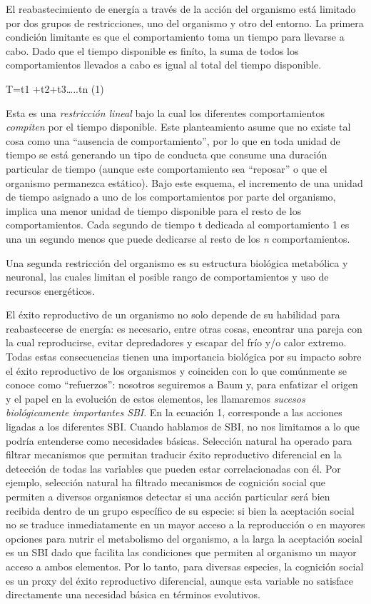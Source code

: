 \documentclass[
  a4paper,
  DIV=11,
  numbers=noendperiod]{scrreprt}
\begin{document}
El reabastecimiento de energía a través de la acción del organismo está
limitado por dos grupos de restricciones, uno del organismo y otro del
entorno. La primera condición limitante es que el comportamiento toma un
tiempo para llevarse a cabo. Dado que el tiempo disponible es ﬁníto, la
suma de todos los comportamientos llevados a cabo es igual al total del
tiempo disponible.

T=t1 +t2+t3\ldots..tn (1)

Esta es una \emph{restricción lineal} bajo la cual los diferentes
comportamientos \emph{compiten} por el tiempo disponible. Este
planteamiento asume que no existe tal cosa como una ``ausencia de
comportamiento'', por lo que en toda unidad de tiempo se está generando
un tipo de conducta que consume una duración particular de tiempo
(aunque este comportamiento sea ``reposar'' o que el organismo
permanezca estático). Bajo este esquema, el incremento de una unidad de
tiempo asignado a uno de los comportamientos por parte del organismo,
implica una menor unidad de tiempo disponible para el resto de los
comportamientos. Cada segundo de tiempo t dedicada al comportamiento 1
es una un segundo menos que puede dedicarse al resto de los \emph{n}
comportamientos.

Una segunda restricción del organismo es su estructura biológica
metabólica y neuronal, las cuales limitan el posible rango de
comportamientos y uso de recursos energéticos.

El éxito reproductivo de un organismo no solo depende de su habilidad
para reabastecerse de energía: es necesario, entre otras cosas,
encontrar una pareja con la cual reproducirse, evitar depredadores y
escapar del frío y/o calor extremo. Todas estas consecuencias tienen una
importancia biológica por su impacto sobre el éxito reproductivo de los
organismos y coinciden con lo que comúnmente se conoce como
``refuerzos'': nosotros seguiremos a Baum y, para enfatizar el origen y
el papel en la evolución de estos elementos, les llamaremos
\emph{sucesos biológicamente importantes SBI}. En la ecuación 1,
corresponde a las acciones ligadas a los diferentes SBI. Cuando hablamos
de SBI, no nos limitamos a lo que podría entenderse como necesidades
básicas. Selección natural ha operado para filtrar mecanismos que
permitan traducir éxito reproductivo diferencial en la detección de
todas las variables que pueden estar correlacionadas con él. Por
ejemplo, selección natural ha filtrado mecanismos de cognición social
que permiten a diversos organismos detectar si una acción particular
será bien recibida dentro de un grupo específico de su especie: si bien
la aceptación social no se traduce inmediatamente en un mayor acceso a
la reproducción o en mayores opciones para nutrir el metabolismo del
organismo, a la larga la aceptación social es un SBI dado que facilita
las condiciones que permiten al organismo un mayor acceso a ambos
elementos. Por lo tanto, para diversas especies, la cognición social es
un proxy del éxito reproductivo diferencial, aunque esta variable no
satisface directamente una necesidad básica en términos evolutivos.
\end{document}
